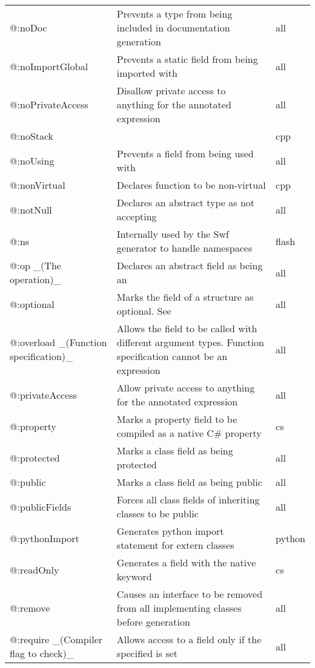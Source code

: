 \begin{center}
\begin{tabular}{| l | l | l |}
	@:noDoc  &  Prevents a type from being included in documentation generation  &  all \\
	@:noImportGlobal  &  Prevents a static field from being imported with \expr{import Class.*}  &  all \\
	@:noPrivateAccess  &  Disallow private access to anything for the annotated expression  &  all \\
	@:noStack &     &  cpp \\
	@:noUsing &  Prevents a field from being used with \expr{using}  &  all \\
	@:nonVirtual &  Declares function to be non-virtual  &  cpp \\
	@:notNull &  Declares an abstract type as not accepting \tref{\expr{null} values}{types-nullability}  &  all \\
	@:ns  &  Internally used by the Swf generator to handle namespaces   &  flash \\
	@:op \_(The operation)\_  &   Declares an abstract field as being an \tref{operator overload}{types-abstract-operator-overloading}  &  all \\
	@:optional  &  Marks the field of a structure as optional. See \tref{Optional Arguments}{types-nullability-optional-arguments}  &  all \\
	@:overload \_(Function specification)\_  &  Allows the field to be called with different argument types. Function specification cannot be an expression  &  all \\
	@:privateAccess  &  Allow private access to anything for the annotated expression  &  all \\
	@:property  &  Marks a property field to be compiled as a native C\# property   &  cs \\
	@:protected  &  Marks a class field as being protected  &  all \\
	@:public  &  Marks a class field as being public  &  all \\
	@:publicFields  &  Forces all class fields of inheriting classes to be public  &  all \\
	@:pythonImport  &  Generates python import statement for extern classes  &  python \\
	@:readOnly  &  Generates a field with the \expr{readonly} native keyword   &  cs \\
	@:remove  &  Causes an interface to be removed from all implementing classes before generation  &  all \\
	@:require \_(Compiler flag to check)\_  &  Allows access to a field only if the specified \tref{compiler flag}{lf-condition-compilation} is set  &  all \\

\end{tabular}
\end{center}
